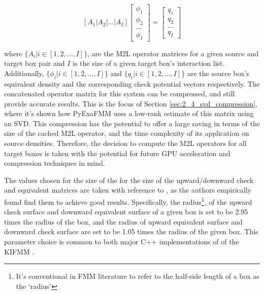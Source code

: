 \begin{equation}
    \left [ A_1 | A_2 | ... | A_I \right] \begin{bmatrix} \phi_1 \\ \phi_2 \\  ... \\  \phi_I \end{bmatrix} = \begin{bmatrix} q_1\\ q_2\\  ... \\  q_I \end{bmatrix}
    \label{eq:2_3_concatenated_m2l}
\end{equation}

where $\{A_i | i \in [1, 2, ..., I]\}$, are the M2L operator matrices for a given
source and target box pair and $I$ is the size of a given
target box's interaction list. Additionally, $\{\phi_i | i \in [1,2, ..., I]\}$ and $\{q_i | i \in [1,2, ..., I]\}$
are the source box's equivalent density and the corresponding check potential vectors
respectively. The concatenated operator matrix for this system can be compressed, and still
provide accurate results. This is the focus of Section \ref{sec:2_4_svd_compression},
where it's shown how \gls{PyExaFMM} uses a low-rank estimate of this matrix using
an \gls{SVD}. This compression has the potential to offer a large saving in terms
of the size of the cached M2L operator, and the time complexity of its application
on source densities. Therefore, the decision to compute the \gls{M2L} operators for
all target boxes is taken with the potential for future GPU acceleration and
compression techniques in mind.

The values chosen for the size of the for the size of the upward/downward
check and equivalent matrices are taken with reference to \cite{Malhotra:2015:CCP},
as the authors empirically found find them to achieve good results. Specifically,
the radius\footnote{It's conventional in FMM literature to refer to the half-side
length of a box as the `radius'}, of the upward check surface and downward equivalent
surface of a given box is set to be 2.95 times the radius of the box, and the radius of
upward equivalent surface and downward check surface are set to be 1.05 times the radius
of the given box. This parameter choice is common to both major C++ implementations of
of the \gls{KIFMM} \cite{exafmm,Malhotra:2015:CCP}.

